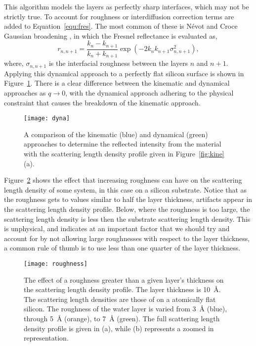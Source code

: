 \documentclass[
 reprint,
 superscriptaddress,
 amsmath,amssymb,
 aps,
]{revtex4-1}
\newcommand{\angstrom}{\rm{\AA}}
\begin{document}
This algorithm models the layers as perfectly sharp interfaces, which may not be strictly true.
To account for roughness or interdiffusion correction terms are added to Equation~\ref{equ:fres}.
The most common of these is N\'{e}vot and Croce Gaussian broadening \cite{nevot_caracterisation_1980}, in which the Fresnel reflectance is evaluated as,
%
\begin{equation}
    r_{n, n+1} = \frac{k_n - k_{n+1}}{k_n + k_{n+1}} \exp{(-2k_nk_{n+1}\sigma^2_{n,n+1})},
\end{equation}
%
where, $\sigma_{n, n+1}$ is the interfacial roughness between the layers $n$ and $n+1$.
Applying this dynamical approach to a perfectly flat silicon surface is shown in Figure~\ref{fig:dyna}.
There is a clear difference between the kinematic and dynamical approaches as $q \to 0$, with the dynamical approach adhering to the physical constraint that causes the breakdown of the kinematic approach. %
%
\begin{figure}[t]
    \texttt{[image: dyna]}
    \caption{A comparison of the kinematic (blue) and dynamical (green) approaches to determine the reflected intensity from the material with the scattering length density profile given in Figure~\ref{fig:kine}(a).}
    \label{fig:dyna}
\end{figure}
%

Figure~\ref{fig:rough} shows the effect that increasing roughness can have on the scattering length density of some system, in this case  on a silicon substrate.
Notice that as the roughness gets to values similar to half the layer thickness, artifacts appear in the scattering length density profile.
Below, where the roughness is too large, the scattering length density is less then the substrate scattering length density.
This is unphysical, and indicates at an important factor that we should try and account for by not allowing large roughnesses with respect to the layer thickness, a common rule of thumb is to use less than one quarter of the layer thickness.
%
\begin{figure}[t]
    \texttt{[image: roughness]}
    \caption{The effect of a roughness greater than a given layer's thickness on the scattering length density profile. The layer thickness is \SI{10}{\angstrom}. The scattering length densities are those of  on a atomically flat silicon. The roughness of the water layer is varied from \SI{3}{\angstrom} (blue), through \SI{5}{\angstrom} (orange), to \SI{7}{\angstrom} (green). The full scattering length density profile is given in (a), while (b) represents a zoomed in representation.}
    \label{fig:rough}
\end{figure}
%
\end{document}
